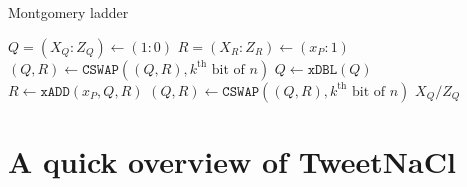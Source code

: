 \documentclass[8pt,aspectratio=169]{beamer}
\begin{document}
%
%



%
%
\begin{frame}[fragile]{Montgomery ladder}
	\begin{algorithm}[H]
		\caption{Montgomery ladder for scalar mult.}
		\begin{algorithmic}
			\STATE $Q = (X_Q:Z_Q) \leftarrow (1:0)$
			\STATE $R = (X_R:Z_R) \leftarrow (x_P:1)$
			\STATE $(Q,R) \leftarrow \texttt{CSWAP}((Q,R), k^{\text{th}}\text{ bit of }n)$
			\STATE $Q \leftarrow \texttt{xDBL}(Q)$
			\STATE $R \leftarrow \texttt{xADD}(x_P,Q,R)$
			\STATE $(Q,R) \leftarrow \texttt{CSWAP}((Q,R), k^{\text{th}}\text{ bit of }n)$
			\ENDFOR
			\RETURN $X_Q/Z_Q$
		\end{algorithmic}
	\end{algorithm}
\end{frame}



\section{A quick overview of TweetNaCl}
\end{document}
